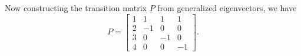 Now constructing the transition matrix $P$ from generalized eigenvectors, we have $$P = \begin{bmatrix}
    1 & 1 & 1 & 1\\
    2&-1&0&0\\
    3&0&-1&0\\
    4&0&0&-1
\end{bmatrix}.$$